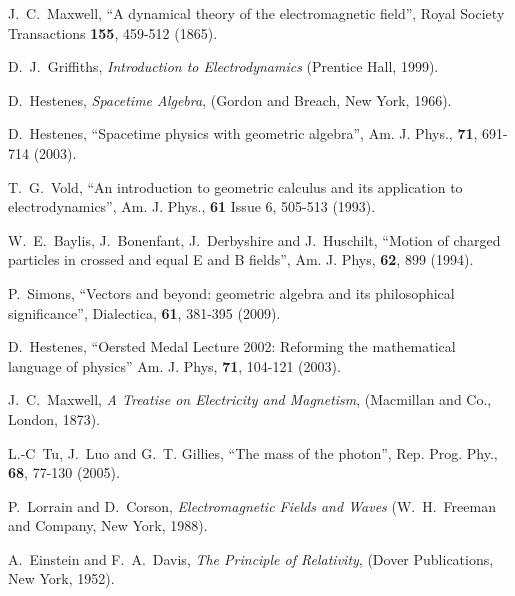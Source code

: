 \documentclass[12pt,aps,prb,preprint]{revtex4}   %
\begin{document}
\begin{thebibliography}{99}


 J.~C.~Maxwell, ``A dynamical theory of the electromagnetic field'', Royal Society
Transactions \textbf{155}, 459-512 (1865).

 D.~J.~Griffiths, \textit{Introduction to Electrodynamics} (Prentice Hall, 1999).

 D.~Hestenes, \textit{Spacetime Algebra}, (Gordon and Breach, New York, 1966).

 D.~Hestenes, ``Spacetime physics with geometric algebra'', Am. J. Phys., \textbf{71}, 691-714 (2003). 

 T.~G.~Vold, ``An introduction to geometric calculus and its application to electrodynamics'', Am. J. Phys., \textbf{61}  Issue 6, 505-513 (1993).

 W.~E.~Baylis, J.~Bonenfant, J.~Derbyshire and J.~Huschilt, ``Motion of charged particles in crossed and equal E and B fields'', Am. J. Phys, \textbf{62}, 899 (1994).

 P.~Simons, ``Vectors and beyond: geometric algebra and its
philosophical significance'', Dialectica, \textbf{61}, 381-395 (2009).

 D.~Hestenes, ``Oersted Medal Lecture 2002: Reforming the mathematical language of physics'' Am. J. Phys, \textbf{71}, 104-121 (2003).


 J.~C.~Maxwell, \textit{A Treatise on Electricity and Magnetism}, (Macmillan and Co., London, 1873).

 L.-C~Tu, J.~Luo and G.~T. Gillies, ``The mass of the photon'', Rep. Prog. Phy., \textbf{68}, 77-130 (2005).

 P.~Lorrain and D.~Corson, \textit{Electromagnetic Fields and Waves} (W.~H.~Freeman and Company, New York, 1988).

 A.~Einstein and F.~A.~Davis, \textit{The Principle of Relativity}, (Dover Publications, New York, 1952).


\end{thebibliography}
\end{document}
